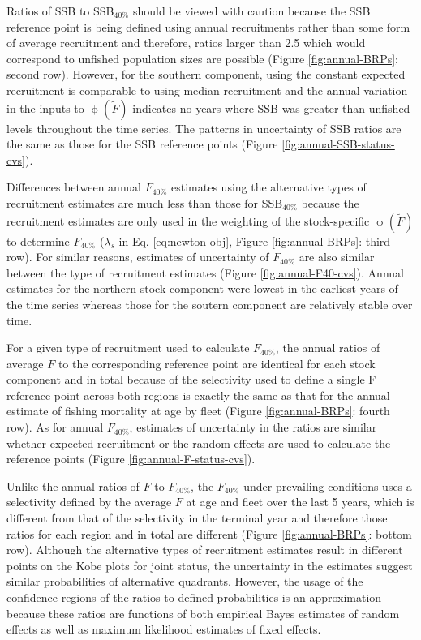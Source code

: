 \documentclass[
]{article}
\begin{document}
Ratios of SSB to SSB\(_{40\%}\) should be viewed with caution because
the SSB reference point is being defined using annual recruitments
rather than some form of average recruitment and therefore, ratios
larger than 2.5 which would correspond to unfished population sizes are
possible (Figure \ref{fig:annual-BRPs}: second row). However, for the
southern component, using the constant expected recruitment is
comparable to using median recruitment and the annual variation in the
inputs to \(\upphi(\widetilde{F})\) indicates no years where SSB was
greater than unfished levels throughout the time series. The patterns in
uncertainty of SSB ratios are the same as those for the SSB reference
points (Figure \ref{fig:annual-SSB-status-cvs}).

Differences between annual \(F_{40\%}\) estimates using the alternative
types of recruitment estimates are much less than those for
SSB\(_{40\%}\) because the recruitment estimates are only used in the
weighting of the stock-specific \(\upphi(\widetilde{F})\) to determine
\(F_{40\%}\) (\(\lambda_s\) in Eq. \ref{eq:newton-obj}, Figure
\ref{fig:annual-BRPs}: third row). For similar reasons, estimates of
uncertainty of \(F_{40\%}\) are also similar between the type of
recruitment estimates (Figure \ref{fig:annual-F40-cvs}). Annual
estimates for the northern stock component were lowest in the earliest
years of the time series whereas those for the soutern component are
relatively stable over time.

For a given type of recruitment used to calculate \(F_{40\%}\), the
annual ratios of average \(F\) to the corresponding reference point are
identical for each stock component and in total because of the
selectivity used to define a single F reference point across both
regions is exactly the same as that for the annual estimate of fishing
mortality at age by fleet (Figure \ref{fig:annual-BRPs}: fourth row). As
for annual \(F_{40\%}\), estimates of uncertainty in the ratios are
similar whether expected recruitment or the random effects are used to
calculate the reference points (Figure \ref{fig:annual-F-status-cvs}).

Unlike the annual ratios of \(F\) to \(F_{40\%}\), the \(F_{40\%}\)
under prevailing conditions uses a selectivity defined by the average
\(F\) at age and fleet over the last 5 years, which is different from
that of the selectivity in the terminal year and therefore those ratios
for each region and in total are different (Figure
\ref{fig:annual-BRPs}: bottom row). Although the alternative types of
recruitment estimates result in different points on the Kobe plots for
joint status, the uncertainty in the estimates suggest similar
probabilities of alternative quadrants. However, the usage of the
confidence regions of the ratios to defined probabilities is an
approximation because these ratios are functions of both empirical Bayes
estimates of random effects as well as maximum likelihood estimates of
fixed effects.
\end{document}
